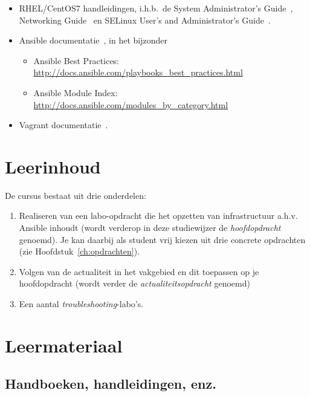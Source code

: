 \begin{itemize}
  \item RHEL/CentOS7 handleidingen, i.h.b.~de System Administrator's Guide~\autocite{SvistunovEtAl2016}, Networking Guide~\autocite{JahodaEtAl2016} en SELinux User's and Administrator's Guide~\autocite{JahodaEtAl2016a}.
  \item Ansible documentatie~\autocite{Ansible2016}, in het bijzonder
  
  \begin{itemize}
    \item Ansible Best Practices: \url{http://docs.ansible.com/playbooks_best_practices.html}
    \item Ansible Module Index: \url{http://docs.ansible.com/modules_by_category.html}
  \end{itemize}
  \item Vagrant documentatie~\autocite{Hashicorp}.
\end{itemize}

\section{Leerinhoud}%
\label{sec:leerinhoud}

De cursus bestaat uit drie onderdelen:

\begin{enumerate}
  \item Realiseren van een labo-opdracht die het opzetten van infrastructuur a.h.v. Ansible inhoudt (wordt verderop in deze studiewijzer de \emph{hoofdopdracht} genoemd). Je kan daarbij als student vrij kiezen uit drie concrete opdrachten (zie Hoofdstuk~\ref{ch:opdrachten}).
  \item Volgen van de actualiteit in het vakgebied en dit toepassen op je hoofdopdracht (wordt verder de \emph{actualiteitsopdracht} genoemd)
  \item Een aantal \emph{troubleshooting}-labo's.
\end{enumerate}

\section{Leermateriaal}%
\label{sec:leermateriaal}

\subsection{Handboeken, handleidingen, enz.}%
\label{ssec:handboeken}

